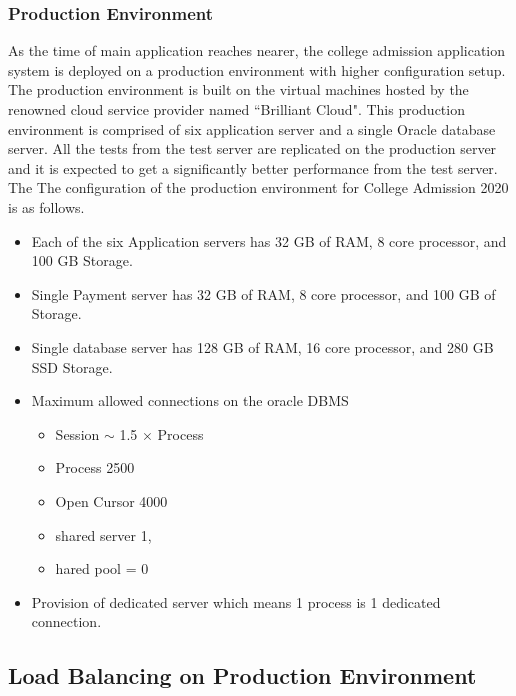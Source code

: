 \documentclass[sigconf,authordraft]{acmart}
\begin{document}
\subsubsection{Production Environment}
As the time of main application reaches nearer, the college admission application system is deployed on a production environment with higher configuration setup. 
The production environment is built on the virtual machines hosted by the renowned cloud service provider named ``Brilliant Cloud". This production environment is comprised of six application server and a single Oracle database server. 
All the tests from the test server are replicated on the production server and it is expected to get a significantly better performance from the test server. 
The 
The configuration of the production environment for College Admission 2020 is as follows.
\begin{itemize}
	\item Each of the six Application servers has 32 GB of RAM, 8 core processor, and 100 GB Storage. 
	\item Single Payment server has 32 GB of RAM, 8 core processor, and 100 GB of Storage.
	\item Single database server has 128 GB of RAM, 16 core processor,  and 280 GB SSD Storage.
	\item Maximum allowed connections on the oracle DBMS
	\begin{itemize}
		\item Session $\sim$ 1.5 $\times$ Process
		\item Process 2500
		\item Open Cursor 4000
		\item shared server 1,
		\item hared pool = 0
	\end{itemize}
	\item Provision of dedicated server which means 1 process is 1 dedicated connection. 
\end{itemize}

\subsection{Load Balancing on Production Environment}
\end{document}
